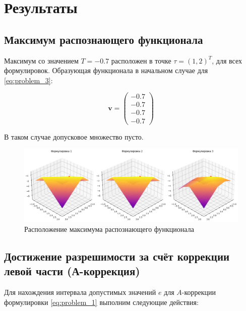 \documentclass{article}
\begin{document}
  \clearpage

  \section{Результаты}

  \subsection{Максимум распознающего функционала}

  Максимум со значением \( T = -0.7 \) расположен в точке
  \( \tau = (1, 2)^T \), для всех формулировок. Образующая функционала в
  начальном случае для \ref{eq:problem_3}:

  \begin{equation}
    \mathbf{v} = \begin{pmatrix}
      -0.7 \\
      -0.7 \\
      -0.7 \\
      -0.7
    \end{pmatrix}
  \end{equation}

  В таком случае допусковое множество пусто.

  \begin{figure}[htbp!]
		\begin{center}
			\includegraphics[width = \textwidth]{tol}
			\caption{Расположение максимума распознающего функционала}
      \label{figure:tol}
		\end{center}
	\end{figure}

  \subsection{Достижение разрешимости за счёт коррекции левой части
  (А-коррекция)}

  Для нахождения интервала допустимых значений \( e \) для
  \( A \)-коррекции формулировки \ref{eq:problem_1} выполним следующие
  действия:
\end{document}
